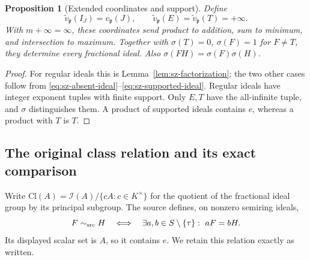 \documentclass[11pt,a4paper]{article}
\newtheorem{proposition}[theorem]{Proposition}
\theoremstyle{definition}\newtheorem{definition}[theorem]{Definition}
\begin{document}
\begin{proposition}[Extended coordinates and support]\label{prop:sz-extended-values}
Define
\[
 \widetilde v_{\mathfrak p}(I_J)=v_{\mathfrak p}(J),\qquad
 \widetilde v_{\mathfrak p}(E)=\widetilde v_{\mathfrak p}(T)=+\infty .
\]
With \(m+\infty=\infty\), these coordinates send product to addition,
sum to minimum, and intersection to maximum. Together with
\(\sigma(T)=0\), \(\sigma(F)=1\) for \(F\ne T\), they determine
every fractional ideal. Also \(\sigma(FH)=\sigma(F)\sigma(H)\).
\end{proposition}
\begin{proof}
For regular ideals this is Lemma~\ref{lem:sz-factorization};
the two other cases follow from
\eqref{eq:sz-absent-ideal}--\eqref{eq:sz-supported-ideal}.
Regular ideals have integer exponent tuples with finite support.
Only \(E,T\) have the all-infinite tuple, and \(\sigma\) distinguishes
them. A product of supported ideals contains \(e\), whereas a
product with \(T\) is \(T\).
\end{proof}

\subsection{The original class relation and its exact comparison}

Write \(\mathrm{Cl}(A)=\mathcal I(A)/\{cA:c\in K^\times\}\) for
the quotient of the fractional ideal group by its principal subgroup.
The source \cite[definition before \texttt{thm:class-semigroup}]
{globalization} defines, on nonzero semiring ideals,
\begin{equation}\label{eq:sz-original-class}
 F\sim_{\rm src}H\quad\Longleftrightarrow\quad
 \exists a,b\in S\setminus\{\tau\}:\ aF=bH .
\end{equation}
Its displayed scalar set is \(A\), so it contains \(e\).
We retain this relation exactly as written.
\end{document}

